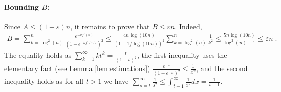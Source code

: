 \documentclass[11pt]{article}
\makeatletter
\theoremstyle{plain}
\renewenvironment{proof}[1][\proofname]
{\par\pushQED{\qed}
	\normalfont\topsep6\p@\@plus6\p@\relax\trivlist
	\item[\hskip\labelsep\bfseries#1\@addpunct{.}]
	\ignorespaces}
{\popQED\endtrivlist\@endpefalse}
\makeatother
\begin{document}
\begin{proof}[Proof of Theorem \ref{thm:primes} (upper bound)]
\paragraph{Bounding $B$:}
Since $A \leq (1-\varepsilon)n$, it remains to prove that $B \leq \varepsilon n$. Indeed,
\begin{align*}
    B = \sum_{k=\log^{2}(n)}^{n}\frac{e^{-kf'(n)}}{\left(1-e^{-kf'(n)}\right)^2}
    \leq \frac{4n\log(10n)}{(1-1/\log(10n))^{2}}\sum _{k=\log^{2}(n)}^{n} \frac{1}{k^{2}}\leq \frac{5n\log(10n)}{\log^2(n)-1}\leq \varepsilon n\;.
\end{align*}
The equality holds as $\sum_{k=1}^{\infty}kt^k=\frac{t}{(1-t)^2}$, the first inequality uses the elementary
fact %
(see Lemma \ref{lem:estimations}) $\frac{e^{-x}}{(1-e^{-x})^2}\leq \frac{1}{x^2}$, and the second inequality holds as for all $t>1$ we have $\sum_{s=t}^{\infty}\frac{1}{s^2}\leq \int_{t-1}^{\infty}\frac{1}{x^2}dx=\frac{1}{t-1}$.
\end{proof}
\end{document}
